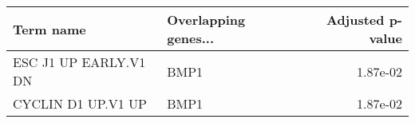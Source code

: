 \begin{tabular}{llr}
\toprule
            Term name & Overlapping genes... &  Adjusted p-value \\
\midrule
ESC J1 UP EARLY.V1 DN &                 BMP1 &          1.87e-02 \\
   CYCLIN D1 UP.V1 UP &                 BMP1 &          1.87e-02 \\
\bottomrule
\end{tabular}
